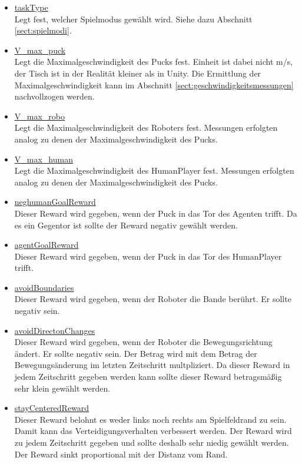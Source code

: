 \begin{itemize}
\item \underline{taskType} \\
Legt fest, welcher Spielmodus gewählt wird. Siehe dazu Abschnitt \ref{sect:spielmodi}.

\item \underline{V\_max\_puck} \\
Legt die Maximalgeschwindigkeit des Pucks fest. Einheit ist dabei nicht m/s, der Tisch ist in der Realität kleiner als in Unity. Die Ermittlung der Maximalgeschwindigkeit kann im Abschnitt \ref{sect:geschwindigkeitsmessungen} nachvollzogen werden.

\item \underline{V\_max\_robo} \\
Legt die Maximalgeschwindigkeit des Roboters fest. Messungen erfolgten analog zu denen der Maximalgeschwindigkeit des Pucks.

\item \underline{V\_max\_human} \\
Legt die Maximalgeschwindigkeit des HumanPlayer fest. Messungen erfolgten analog zu denen der Maximalgeschwindigkeit des Pucks.

\item \underline{neghumanGoalReward} \\
Dieser Reward wird gegeben, wenn der Puck in das Tor des Agenten trifft. Da es ein Gegentor ist sollte der Reward negativ gewählt werden.

\item \underline{agentGoalReward} \\
Dieser Reward wird gegeben, wenn der Puck in das Tor des HumanPlayer trifft. 

\item \underline{avoidBoundaries} \\
Dieser Reward wird gegeben, wenn der Roboter die Bande berührt. Er sollte negativ sein. 

\item \underline{avoidDirectonChanges} \\
Dieser Reward wird gegeben, wenn der Roboter die Bewegungsrichtung ändert. Er sollte negativ sein. Der Betrag wird mit dem Betrag der Bewegungsänderung im letzten Zeitschritt multpliziert. Da dieser Reward in jedem Zeitschritt gegeben werden kann sollte dieser Reward betragsmäßig sehr klein gewählt werden.

\item \underline{stayCenteredReward} \\
Dieser Reward belohnt es weder links noch rechts am Spielfeldrand zu sein. Damit kann das Verteidigungsverhalten verbessert werden. Der Reward wird zu jedem Zeitschritt gegeben und sollte deshalb sehr niedig gewählt werden. Der Reward sinkt proportional mit der Distanz vom Rand.


\end{itemize}
